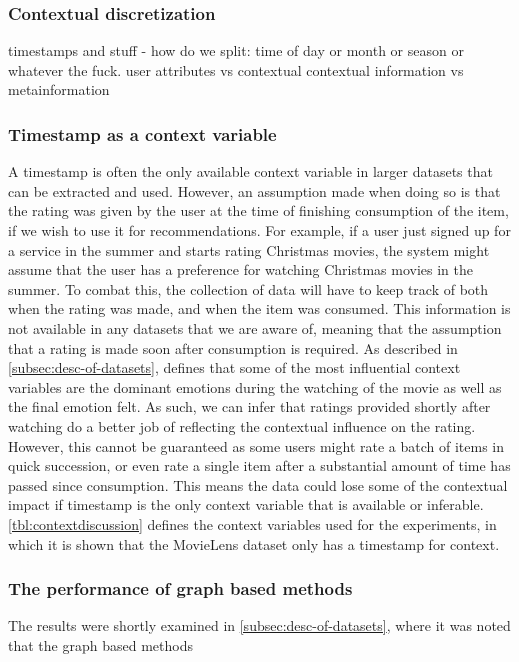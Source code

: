 \subsubsection{Contextual discretization} %
timestamps and stuff - how do we split: time of day or month or season or whatever the fuck.
user attributes vs contextual
contextual information vs metainformation


\subsubsection{Timestamp as a context variable}
A timestamp is often the only available context variable in larger datasets that can be extracted and used.
However, an assumption made when doing so is that the rating was given by the user at the time of finishing consumption of the item, if we wish to use it for recommendations.
For example, if a user just signed up for a service in the summer and starts rating Christmas movies, the system might assume that the user has a preference for watching Christmas movies in the summer.
To combat this, the collection of data will have to keep track of both when the rating was made, and when the item was consumed.
This information is not available in any datasets that we are aware of, meaning that the assumption that a rating is made soon after consumption is required.
As described in \autoref{subsec:desc-of-datasets}, \cite{COMODA2013} defines that some of the most influential context variables are the dominant emotions during the watching of the movie as well as the final emotion felt.
As such, we can infer that ratings provided shortly after watching do a better job of reflecting the contextual influence on the rating.
However, this cannot be guaranteed as some users might rate a batch of items in quick succession, or even rate a single item after a substantial amount of time has passed since consumption.
This means the data could lose some of the contextual impact if timestamp is the only context variable that is available or inferable.
\autoref{tbl:contextdiscussion} defines the context variables used for the experiments, in which it is shown that the MovieLens dataset only has a timestamp for context. 

\subsubsection{The performance of graph based methods} %
The results were shortly examined in \autoref{subsec:desc-of-datasets}, where it was noted that the graph based methods 


